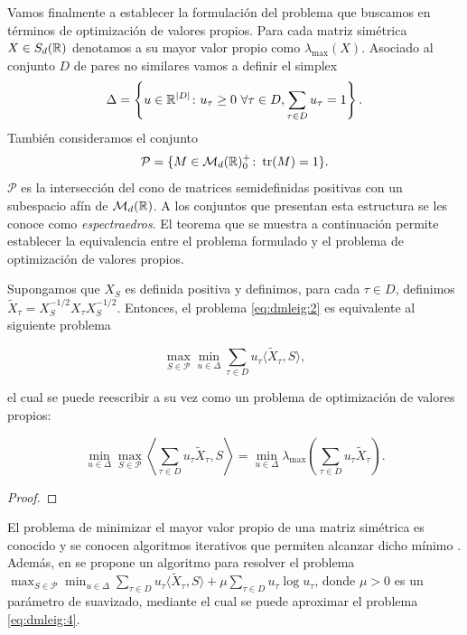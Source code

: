 \documentclass{book}
\begin{document}
Vamos finalmente a establecer la formulación del problema que buscamos en términos de optimización de valores propios. Para cada matriz simétrica $X \in S_d(\mathbb{R})$ denotamos a su mayor valor propio como $\lambda_{\max}(X)$. Asociado al conjunto $D$ de pares no similares vamos a definir el simplex
\[ \Delta = \left\{u \in \mathbb{R}^{|D|} \colon u_\tau \ge 0 \ \forall \tau \in D, \sum_{\tau \in D} u_{\tau} = 1 \right\}. \]
También consideramos el conjunto
\[ \mathcal{P} = \{M \in \mathcal{M}_d(\mathbb{R})^+_0 \colon \operatorname{tr}(M) = 1 \}.  \]
$\mathcal{P}$ es la intersección del cono de matrices semidefinidas positivas con un subespacio afín de $\mathcal{M}_d(\mathbb{R})$. A los conjuntos que presentan esta estructura se les conoce como \emph{espectraedros}. El teorema que se muestra a continuación permite establecer la equivalencia entre el problema formulado y el problema de optimización de valores propios.

\begin{thm}
	Supongamos que $X_S$ es definida positiva y definimos, para cada $\tau \in D$, definimos $\widetilde{X}_{\tau} = X_S^{-1/2}X_{\tau}X_S^{-1/2}$. Entonces, el problema \ref{eq:dmleig:2} es equivalente al siguiente problema

	\begin{equation} \label{eq:dmleig:3}
		\max_{S \in \mathcal{P}} \min_{u \in \Delta} \sum_{\tau \in D} u_{\tau}\langle \widetilde{X}_{\tau},S\rangle,
	\end{equation}

	el cual se puede reescribir a su vez como un problema de optimización de valores propios:

	\begin{equation} \label{eq:dmleig:4}
		\min_{u \in \Delta} \max_{S \in \mathcal{P}} \left\langle \sum_{\tau \in D} u_{\tau} \widetilde{X}_{\tau},S\right\rangle = \min_{u \in \Delta} \lambda_{\max}\left( \sum_{\tau\in D}u_{\tau}\widetilde{X}_{\tau} \right).
	\end{equation}
\end{thm}

\begin{proof}

\end{proof}

El problema de minimizar el mayor valor propio de una matriz simétrica es conocido y se conocen algoritmos iterativos que permiten alcanzar dicho mínimo \cite{overton1988minimizing}. Además, en \cite{dmleig} se propone un algoritmo para resolver el problema $\max_{S \in \mathcal{P}} \min_{u \in \Delta} \sum_{\tau \in D} u_{\tau}\langle \widetilde{X}_{\tau},S\rangle + \mu \sum_{\tau \in D} u_{\tau} \log u_{\tau}$, donde $\mu > 0$ es un parámetro de suavizado, mediante el cual se puede aproximar el problema \ref{eq:dmleig:4}.
\end{document}
